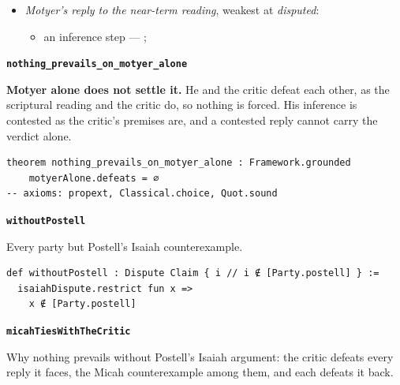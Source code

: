 \documentclass[11pt]{article}
\begin{document}
\begin{itemize}
\begin{itemize}
\item Mary conceived Jesus while a virgin --- Matt 1:18-25; Luke 1:26-38; \cite[30--33]{brown-problem-virginal-conception-1972}
\item an inference step --- \cite[ad loc. Isa 7:14]{motyer-isaiah-1993}
\item an inference step --- \cite{miravalle-meet-your-mother-2014}
\item an inference step --- \cite{miravalle-introduction-mary-2020}
\item an inference step --- \cite[490--493]{postell-isaiah-messianic-2025}
\item an inference step --- \cite[ad loc. Matt 1:23]{france-matthew-2007}
\end{itemize}
\item \emph{Motyer’s reply to the near-term reading}, weakest at \emph{disputed}:
\begin{itemize}
\item an inference step --- \cite[124]{motyer-context-content-1970}; \cite[5]{compton-immanuel-prophecy-2007}
\end{itemize}
\end{itemize}
\par\medskip\noindent\textbf{\texttt{nothing\_\allowbreak{}prevails\_\allowbreak{}on\_\allowbreak{}motyer\_\allowbreak{}alone}}\par\nobreak\noindent
\textbf{Motyer alone does not settle it.} He and the critic defeat each other, as the scriptural reading and the critic do, so nothing is forced. His inference is contested as the critic’s premises are, and a contested reply cannot carry the verdict alone.

{\small\begin{verbatim}
theorem nothing_prevails_on_motyer_alone : Framework.grounded
    motyerAlone.defeats = ∅
-- axioms: propext, Classical.choice, Quot.sound
\end{verbatim}}
\par\medskip\noindent\textbf{\texttt{without\allowbreak{}Postell}}\par\nobreak\noindent
Every party but Postell’s Isaiah counterexample.

{\small\begin{verbatim}
def withoutPostell : Dispute Claim { i // i ∉ [Party.postell] } :=
  isaiahDispute.restrict fun x =>
    x ∉ [Party.postell]
\end{verbatim}}
\par\medskip\noindent\textbf{\texttt{micah\allowbreak{}Ties\allowbreak{}With\allowbreak{}The\allowbreak{}Critic}}\par\nobreak\noindent
Why nothing prevails without Postell’s Isaiah argument: the critic defeats every reply it faces, the Micah counterexample among them, and each defeats it back.
\end{document}
